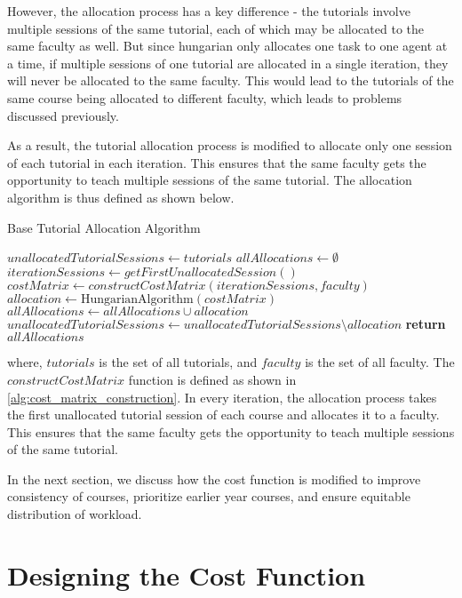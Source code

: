 However, the allocation process has a key difference - the tutorials involve multiple sessions of the same tutorial, each of which may be allocated to the same faculty as well. But since hungarian only allocates one task to one agent at a time, if multiple sessions of one tutorial are allocated in a single iteration, they will never be allocated to the same faculty. This would lead to the tutorials of the same course being allocated to different faculty, which leads to problems discussed previously.

As a result, the tutorial allocation process is modified to allocate only one session of each tutorial in each iteration. This ensures that the same faculty gets the opportunity to teach multiple sessions of the same tutorial. The allocation algorithm is thus defined as shown below.

\begin{algorithm}[H]
  \caption*{Base Tutorial Allocation Algorithm}
  \begin{algorithmic}
    \State $unallocatedTutorialSessions \gets tutorials$
    \State $allAllocations \gets \emptyset$
    \State $iterationSessions \gets getFirstUnallocatedSession()$
    \State $costMatrix \gets constructCostMatrix(iterationSessions, faculty)$
    \State $allocation \gets \text{HungarianAlgorithm}(costMatrix)$
    \State $allAllocations \gets allAllocations \cup allocation$
    \State $unallocatedTutorialSessions \gets unallocatedTutorialSessions \setminus allocation$
    \EndWhile
    \State \textbf{return} $allAllocations$
    \EndProcedure
  \end{algorithmic}
\end{algorithm}

where, $tutorials$ is the set of all tutorials, and $faculty$ is the set of all faculty. The $constructCostMatrix$ function is defined as shown in \autoref{alg:cost_matrix_construction}. In every iteration, the allocation process takes the first unallocated tutorial session of each course and allocates it to a faculty. This ensures that the same faculty gets the opportunity to teach multiple sessions of the same tutorial.

In the next section, we discuss how the cost function is modified to improve consistency of courses, prioritize earlier year courses, and ensure equitable distribution of workload.

\section{Designing the Cost Function}


